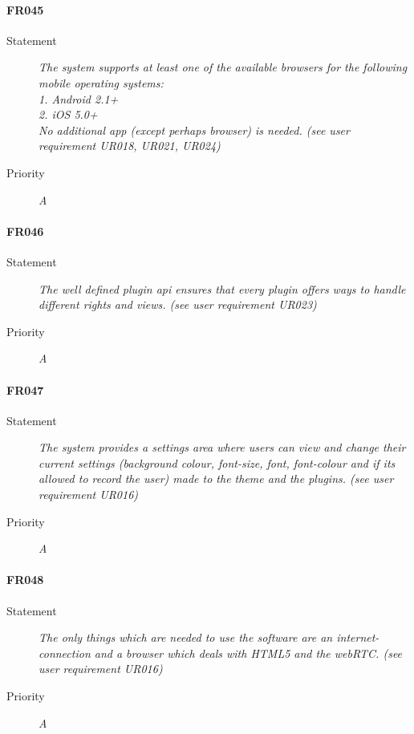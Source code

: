 \paragraph{FR045}
\begin{description}
  \item[Statement]
    \textit{The system supports at least one of the available browsers
      for the following mobile operating systems:\\1. Android
      2.1+\\2. iOS 5.0+\\No additional app (except perhaps browser) is needed. (see user requirement UR018, UR021, UR024)}
  \item[Priority]
    \textit{A}
\end{description}


\paragraph{FR046}
\begin{description}
  \item[Statement]
    \textit{The well defined plugin api ensures that every plugin offers ways to handle different rights and views. (see user requirement UR023)}
  \item[Priority]
    \textit{A}
\end{description}

\paragraph{FR047}
\begin{description}
  \item[Statement]
    \textit{The system provides a settings area where users can view and change their current settings (background colour, font-size, font, font-colour and if its allowed to record the user) made to the theme and the plugins. (see user requirement UR016)}
  \item[Priority]
    \textit{A}
\end{description}

\paragraph{FR048}
\begin{description}
  \item[Statement]
    \textit{The only things which are needed to use the software are an internet-connection and a browser which deals with HTML5 and the webRTC. (see user requirement UR016)}
  \item[Priority]
    \textit{A}
\end{description}

